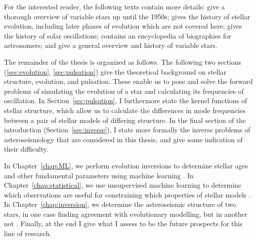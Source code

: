 For the interested reader, the following texts contain more details: 
\citet{1958HDP....51..353L} give a thorough overview of variable stars up until the 1950s; 
\citet{ARNY1990211} gives the history of stellar evolution, including later phases of evolution which are not covered here; 
\citet{2016lrsp...13....2b} gives the history of solar oscillations;
\citet{bolt2007biographical} contains an encyclopedia of biographies for astronomers;
and \citet{2015pust.book.....C} give a general overview and history of variable stars.

The remainder of the thesis is organized as follows. 
The following two sections (\ref{sec:evolution}, \ref{sec:pulsation}) give the theoretical background on stellar structure, evolution, and pulsation. 
These enable us to pose and solve the forward problems of simulating the evolution of a star and calculating its frequencies of oscillation. 
In Section~\ref{sec:pulsation}, I furthermore state the kernel functions of stellar structure, which allow us to calculate the differences in mode frequencies between a pair of stellar models of differing structure. 
In the final section of the introduction (Section~\ref{sec:inverse}), I state more formally the inverse problems of asteroseismology that are considered in this thesis, and give some indication of their difficulty. 

In Chapter~\ref{chap:ML}, we perform evolution inversions to determine stellar ages and other fundamental parameters using machine learning \citep{2016apj...830...31b}. 
In Chapter~\ref{chap:statistical}, we use unsupervised machine learning to determine which observations are useful for constraining which properties of stellar models \citep{2017apj...839..116a}. 
In Chapter~\ref{chap:inversion}, we determine the asteroseismic structure of two stars, in one case finding agreement with evolutionary modelling, but in another not \citep{2017ApJ...851...80B}. 
Finally, at the end I give what I assess to be the future prospects for this line of research. 






